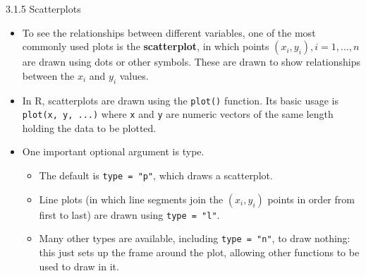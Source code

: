 \documentclass[
  9pt,
  a4paper,
  ignorenonframetext,
  notheorems]{beamer}
\providecommand{\tightlist}{%
  \setlength{\itemsep}{0pt}\setlength{\parskip}{0pt}}\usepackage{longtable,booktabs,array}
\begin{document}
\begin{frame}[fragile]{3.1.5 Scatterplots}
\protect\hypertarget{scatterplots}{}
\begin{itemize}
\tightlist
\item
  To see the relationships between different variables, one of the most
  commonly used plots is the \textbf{scatterplot}, in which points
  \((x_i,y_i), i = 1,\ldots,n\) are drawn using dots or other symbols.
  These are drawn to show relationships between the \(x_i\) and \(y_i\)
  values.
\end{itemize}

\begin{itemize}
\tightlist
\item
  In R, scatterplots are drawn using the \texttt{plot()} function. Its
  basic usage is \texttt{plot(x,\ y,\ ...)} where \texttt{x} and
  \texttt{y} are numeric vectors of the same length holding the data to
  be plotted.
\end{itemize}

\begin{itemize}
\tightlist
\item
  One important optional argument is type.

  \begin{itemize}
  \tightlist
  \item
    The default is \texttt{type\ =\ "p"}, which draws a scatterplot.
  \item
    Line plots (in which line segments join the \((x_i,y_i)\) points in
    order from first to last) are drawn using \texttt{type\ =\ "l"}.
  \item
    Many other types are available, including \texttt{type\ =\ "n"}, to
    draw nothing: this just sets up the frame around the plot, allowing
    other functions to be used to draw in it.
  \end{itemize}
\end{itemize}
\end{frame}
\end{document}

